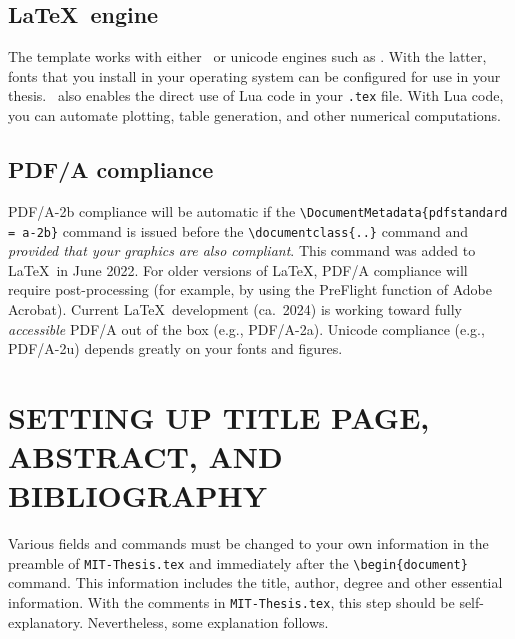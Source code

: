\documentclass[11pt]{article}
\newcommand*\pdfTeX{\hologo{pdfTeX}}
\begin{document}
\subsection{\LaTeX\ engine}
The template works with either \pdfTeX\ or unicode engines such as \LuaLaTeX.  With the latter, fonts that you install in your operating system can be configured for use in your thesis. \LuaLaTeX\ also enables the direct use of Lua code in your \texttt{.tex} file. With Lua code, you can automate plotting, table generation, and other numerical computations.

\subsection{PDF/A compliance}
PDF/A-2b compliance will be automatic if the \verb|\DocumentMetadata{pdfstandard = a-2b}| command is issued before the \verb|\documentclass{..}| command and \textit{provided that your graphics are also compliant}. This command was added to \LaTeX\ in June 2022. For older versions of \LaTeX,
PDF/A compliance will require post-processing (for example, by using the PreFlight function of Adobe Acrobat).  Current \LaTeX\ development (ca.~2024) is working toward fully \textit{accessible} PDF/A out of the box (e.g., PDF/A-2a). Unicode compliance (e.g., PDF/A-2u) depends greatly on your fonts and figures.



\section{SETTING UP TITLE PAGE, ABSTRACT, AND BIBLIOGRAPHY}
Various fields and commands must be changed to your own information in the preamble of \texttt{MIT-Thesis.tex} and immediately after the \verb|\begin{document}| command. This information includes the title, author, degree and other essential information.  With the comments in \texttt{MIT-Thesis.tex}, this step should be self-explanatory. Nevertheless, some explanation follows.
\end{document}
